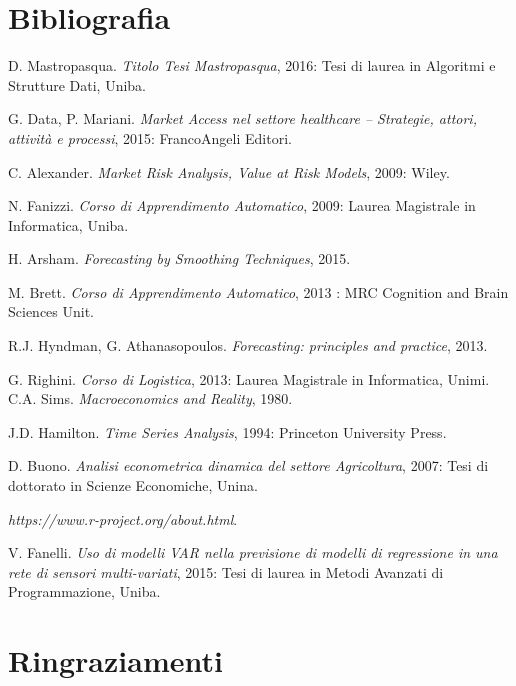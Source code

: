 \documentclass[12pt,a4paper,twoside,openright]{book}
\begin{document}
\chapter{Bibliografia}
  \begin{thebibliography}{1}

   D. Mastropasqua. {\em Titolo Tesi Mastropasqua}, 2016: Tesi di laurea in Algoritmi e Strutture Dati, Uniba.

   G. Data, P. Mariani. {\em Market Access nel settore healthcare – Strategie, attori, attività e processi}, 2015:  FrancoAngeli Editori.

   C. Alexander. {\em Market Risk Analysis, Value at Risk Models}, 2009: Wiley.

   N. Fanizzi. {\em Corso di Apprendimento Automatico}, 2009: Laurea Magistrale in Informatica, Uniba.
  
   H. Arsham. {\em Forecasting by Smoothing Techniques}, 2015.
  
   M. Brett. {\em Corso di Apprendimento Automatico}, 2013 : MRC Cognition and Brain Sciences Unit.
  
     R.J. Hyndman, G. Athanasopoulos. {\em Forecasting: principles and practice}, 2013.
    
     G. Righini. {\em Corso di Logistica}, 2013: Laurea Magistrale in Informatica, Unimi.
     C.A. Sims. {\em Macroeconomics and Reality}, 1980.
    
     J.D. Hamilton. {\em Time Series Analysis}, 1994: Princeton University Press.
   
     D. Buono. {\em Analisi econometrica dinamica del settore Agricoltura}, 2007: Tesi di dottorato in Scienze Economiche, Unina.
    
     {\em https://www.r-project.org/about.html}.
    
     V. Fanelli. {\em Uso di modelli VAR nella previsione di modelli di regressione in una rete di sensori multi-variati}, 2015: Tesi di laurea in Metodi Avanzati di Programmazione, Uniba.
  \end{thebibliography}
\chapter{Ringraziamenti}
\end{document}
